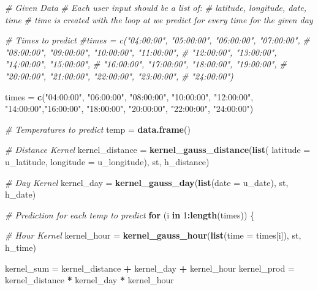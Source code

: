 \documentclass[]{article}
\newenvironment{Shaded}{\begin{snugshade}}{\end{snugshade}}
\newcommand{\KeywordTok}[1]{\textcolor[rgb]{0.13,0.29,0.53}{\textbf{#1}}}
\newcommand{\DataTypeTok}[1]{\textcolor[rgb]{0.13,0.29,0.53}{#1}}
\newcommand{\DecValTok}[1]{\textcolor[rgb]{0.00,0.00,0.81}{#1}}
\newcommand{\StringTok}[1]{\textcolor[rgb]{0.31,0.60,0.02}{#1}}
\newcommand{\CommentTok}[1]{\textcolor[rgb]{0.56,0.35,0.01}{\textit{#1}}}
\newcommand{\ControlFlowTok}[1]{\textcolor[rgb]{0.13,0.29,0.53}{\textbf{#1}}}
\newcommand{\OperatorTok}[1]{\textcolor[rgb]{0.81,0.36,0.00}{\textbf{#1}}}
\newcommand{\NormalTok}[1]{#1}
\begin{document}
\begin{Shaded}
\begin{Highlighting}[]
{{{{{{{  \CommentTok{# Given Data}
  \CommentTok{# Each user input should be a list of:}
  \CommentTok{# latitude, longitude, date, time}
  \CommentTok{# time is created with the loop at we predict for every time for the given day}
  
  \CommentTok{# Times to predict}
  \CommentTok{#times = c("04:00:00", "05:00:00", "06:00:00", "07:00:00",}
  \CommentTok{#          "08:00:00", "09:00:00", "10:00:00", "11:00:00",}
  \CommentTok{#          "12:00:00", "13:00:00", "14:00:00", "15:00:00",}
  \CommentTok{#          "16:00:00", "17:00:00", "18:00:00", "19:00:00",}
  \CommentTok{#          "20:00:00", "21:00:00", "22:00:00", "23:00:00",}
  \CommentTok{#          "24:00:00")}
  
\NormalTok{  times =}\StringTok{ }\KeywordTok{c}\NormalTok{(}\StringTok{"04:00:00"}\NormalTok{, }\StringTok{"06:00:00"}\NormalTok{, }\StringTok{"08:00:00"}\NormalTok{,  }\StringTok{"10:00:00"}\NormalTok{, }
            \StringTok{"12:00:00"}\NormalTok{,  }\StringTok{"14:00:00"}\NormalTok{,}\StringTok{"16:00:00"}\NormalTok{,  }\StringTok{"18:00:00"}\NormalTok{,}
            \StringTok{"20:00:00"}\NormalTok{,  }\StringTok{"22:00:00"}\NormalTok{, }\StringTok{"24:00:00"}\NormalTok{)}
  
  \CommentTok{# Temperatures to predict}
\NormalTok{  temp =}\StringTok{ }\KeywordTok{data.frame}\NormalTok{()}
  
  \CommentTok{# Distance Kernel}
\NormalTok{  kernel_distance =}\StringTok{ }\KeywordTok{kernel_gauss_distance}\NormalTok{(}\KeywordTok{list}\NormalTok{(}
      \DataTypeTok{latitude =}\NormalTok{ u_latitude, }\DataTypeTok{longitude =}\NormalTok{ u_longitude), st, h_distance)}
  
  \CommentTok{# Day Kernel}
\NormalTok{  kernel_day =}\StringTok{ }\KeywordTok{kernel_gauss_day}\NormalTok{(}\KeywordTok{list}\NormalTok{(}\DataTypeTok{date =}\NormalTok{ u_date), st, h_date)}
  
  \CommentTok{# Prediction for each temp to predict}
  \ControlFlowTok{for}\NormalTok{ (i }\ControlFlowTok{in} \DecValTok{1}\OperatorTok{:}\KeywordTok{length}\NormalTok{(times)) \{}
    
    \CommentTok{# Hour Kernel}
\NormalTok{    kernel_hour =}\StringTok{ }\KeywordTok{kernel_gauss_hour}\NormalTok{(}\KeywordTok{list}\NormalTok{(}\DataTypeTok{time =}\NormalTok{ times[i]), st, h_time)}
    
\NormalTok{    kernel_sum =}\StringTok{ }\NormalTok{kernel_distance }\OperatorTok{+}\StringTok{ }\NormalTok{kernel_day }\OperatorTok{+}\StringTok{ }\NormalTok{kernel_hour}
\NormalTok{    kernel_prod =}\StringTok{ }\NormalTok{kernel_distance }\OperatorTok{*}\StringTok{ }\NormalTok{kernel_day }\OperatorTok{*}\StringTok{ }\NormalTok{kernel_hour}
    
}}}}}}}
\end{Highlighting}
\end{Shaded}
\end{document}
